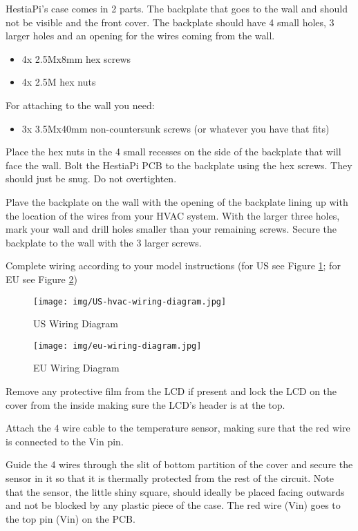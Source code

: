 HestiaPi's case comes in 2 parts. The backplate that goes to the wall and
should not be visible and the front cover. The backplate should have 4 small
holes, 3 larger holes and an opening for the wires coming from the wall.

\begin{itemize}
\item 4x 2.5Mx8mm hex screws
\item 4x 2.5M hex nuts
\end{itemize}

For attaching to the wall you need:
\begin{itemize}
\item 3x 3.5Mx40mm non-countersunk screws (or whatever you have that fits)
\end{itemize}

Place the hex nuts in the 4 small recesses on the side of the backplate that
will face the wall. Bolt the HestiaPi PCB to the backplate using the hex
screws. They should just be snug. Do not overtighten.

Plave the backplate on the wall with the opening of the backplate lining up
with the location of the wires from your HVAC system. With the larger three
holes, mark your wall and drill holes smaller than your remaining screws.
Secure the backplate to the wall with the 3 larger screws.

Complete wiring according to your model instructions (for US see Figure
\ref{fig:us}; for EU see Figure \ref{fig:eu})

\begin{figure}
  \texttt{[image: img/US-hvac-wiring-diagram.jpg]}
  \caption{US Wiring Diagram}
  \label{fig:us}
\end{figure}

\begin{figure}
  \texttt{[image: img/eu-wiring-diagram.jpg]}
  \caption{EU Wiring Diagram}
  \label{fig:eu}
\end{figure}

Remove any protective film from the LCD if present and lock the LCD on the
cover from the inside making sure the LCD's header is at the top.

Attach the 4 wire cable to the temperature sensor, making sure that the red
wire is connected to the Vin pin.

Guide the 4 wires through the slit of bottom partition of the cover and secure
the sensor in it so that it is thermally protected from the rest of the
circuit. Note that the sensor, the little shiny square, should ideally be
placed facing outwards and not be blocked by any plastic piece of the case. The
red wire (Vin) goes to the top pin (Vin) on the PCB.

